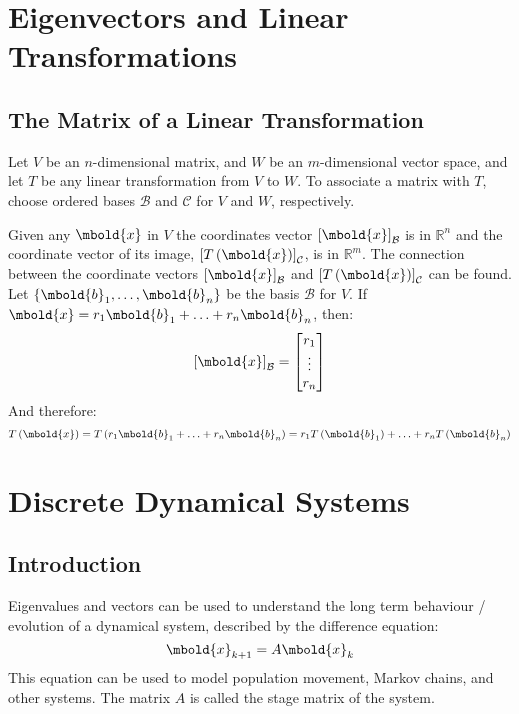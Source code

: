 \documentclass[12pt letter]{report}
\begin{document}
\chapter{Eigenvectors and Linear Transformations}

\section{The Matrix of a Linear Transformation}

Let $V$ be an $n$-dimensional matrix, and $W$ be an $m$-dimensional vector space, and let $T$ be any linear
transformation from $V$ to $W$. To associate a matrix with $T$, choose ordered bases $\mathcal{B}$ and $\mathcal{C}$ for $V$ and
$W$, respectively.

\noindent Given any $\mbold{x}$ in $V$ the coordinates vector $ \left[ \mbold{x} \right]_{\mathcal{B}} $ is in $\mathbb{R}^{n}$
and the coordinate vector of its image, $ \left[ T \left( \mbold{x} \right)  \right]_{\mathcal{C}} $, is in
$\mathbb{R}^{m}$. The connection between the coordinate vectors $ \left[ \mbold{x} \right]_{\mathcal{B}} $ and $ \left[ T \left( \mbold{x}
    \right)  \right]_{\mathcal{C}} $ can be found. Let $\{\mbold{b}_1, \ldots, \mbold{b}_n\} $ be the basis $\mathcal{B}$
for $V$. If $\mbold{x} = r_1\mbold{b}_1 + \ldots + r_n \mbold{b}_n$, then:
\[
  \left[ \mbold{x} \right]_{\mathcal{B}}  = \begin{bmatrix} r_1 \\ \vdots \\ r_n \end{bmatrix}
\]
And therefore:
\[
  T \left( \mbold{x} \right) = T \left( r_1\mbold{b}_1 + \ldots + r_n \mbold{b}_n \right)  = r_1T \left( \mbold{b}_1
  \right) + \ldots + r_n T \left( \mbold{b}_n \right)
\]

\chapter{Discrete Dynamical Systems}
\section{Introduction}
Eigenvalues and vectors can be used to understand the long term behaviour / evolution of a dynamical system, described
by the difference equation:
\[
  \mbold{x}_{k+1} = A \mbold{x}_k
\]
This equation can be used to model population movement, Markov chains, and other systems. The matrix $A$ is called the
stage matrix of the system.
\end{document}
